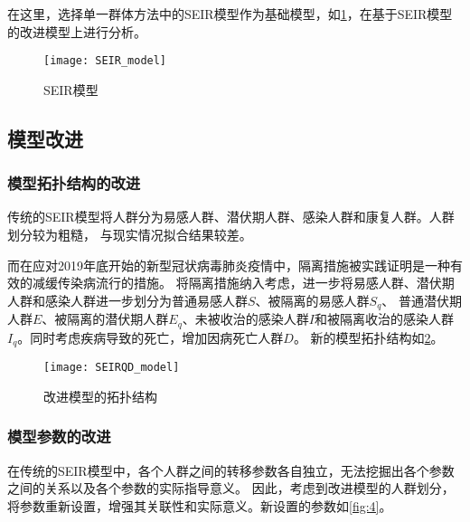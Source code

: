 \documentclass[withoutpreface,bwprint]{cumcmthesis}
\begin{document}
\par
在这里，选择单一群体方法中的SEIR模型作为基础模型，如\cref{fig:2}，在基于SEIR模型的改进模型上进行分析。
\begin{figure}[H]
    \centering
    \texttt{[image: SEIR\_model]}
    \caption{SEIR模型}
    \label{fig:2}
\end{figure}

\subsection{模型改进}
\subsubsection{模型拓扑结构的改进}
传统的SEIR模型将人群分为易感人群、潜伏期人群、感染人群和康复人群。人群划分较为粗糙，
与现实情况拟合结果较差。

而在应对2019年底开始的新型冠状病毒肺炎疫情中，隔离措施被实践证明是一种有效的减缓传染病流行的措施。
将隔离措施纳入考虑，进一步将易感人群、潜伏期人群和感染人群进一步划分为普通易感人群$S$、被隔离的易感人群$S_q$、
普通潜伏期人群$E$、被隔离的潜伏期人群$E_q$、未被收治的感染人群$I$和被隔离收治的感染人群$I_q$。同时考虑疾病导致的死亡，增加因病死亡人群$D$。
新的模型拓扑结构如\cref{fig:3}。

\begin{figure}[H]
    \centering
    \texttt{[image: SEIRQD\_model]}
    \caption{改进模型的拓扑结构}
    \label{fig:3}
\end{figure}


\subsubsection{模型参数的改进}
在传统的SEIR模型中，各个人群之间的转移参数各自独立，无法挖掘出各个参数之间的关系以及各个参数的实际指导意义。
因此，考虑到改进模型的人群划分，将参数重新设置，增强其关联性和实际意义。新设置的参数如\cref{fig:4}。
\end{document}

